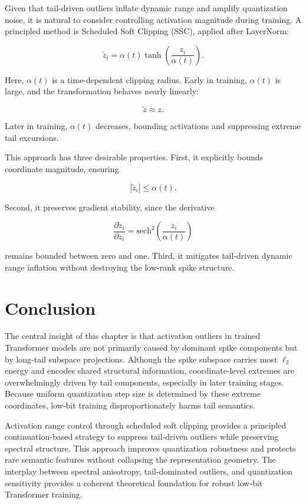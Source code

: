 Given that tail-driven outliers inflate dynamic range and amplify quantization noise, it is natural to consider controlling activation magnitude during training. A principled method is Scheduled Soft Clipping (SSC), applied after LayerNorm:

\[
\tilde{z}_i = \alpha(t) \tanh\left(\frac{z_i}{\alpha(t)}\right).
\]

Here, $\alpha(t)$ is a time-dependent clipping radius. Early in training, $\alpha(t)$ is large, and the transformation behaves nearly linearly:

\[
\tilde{z} \approx z.
\]

Later in training, $\alpha(t)$ decreases, bounding activations and suppressing extreme tail excursions.

This approach has three desirable properties. First, it explicitly bounds coordinate magnitude, ensuring

\[
|\tilde{z}_i| \le \alpha(t).
\]

Second, it preserves gradient stability, since the derivative

\[
\frac{\partial \tilde{z}_i}{\partial z_i}
=
\mathrm{sech}^2\left(\frac{z_i}{\alpha(t)}\right)
\]

remains bounded between zero and one. Third, it mitigates tail-driven dynamic range inflation without destroying the low-rank spike structure.

\section{Conclusion}

The central insight of this chapter is that activation outliers in trained Transformer models are not primarily caused by dominant spike components but by long-tail subspace projections. Although the spike subspace carries most $\ell_2$ energy and encodes shared structural information, coordinate-level extremes are overwhelmingly driven by tail components, especially in later training stages. Because uniform quantization step size is determined by these extreme coordinates, low-bit training disproportionately harms tail semantics.

Activation range control through scheduled soft clipping provides a principled continuation-based strategy to suppress tail-driven outliers while preserving spectral structure. This approach improves quantization robustness and protects rare semantic features without collapsing the representation geometry. The interplay between spectral anisotropy, tail-dominated outliers, and quantization sensitivity provides a coherent theoretical foundation for robust low-bit Transformer training.